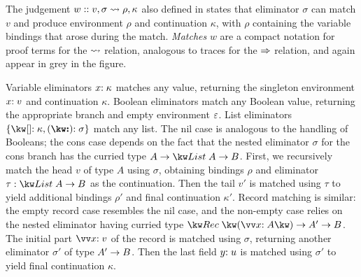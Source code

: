 The judgement $w :: v, \sigma \rightsquigarrow \rho, \kappa$ also defined in  states that eliminator $\sigma$ can match $v$ and produce environment $\rho$ and continuation $\kappa$, with $\rho$ containing the variable bindings that arose during the match. \emph{Matches} $w$ are a compact notation for proof terms for the $\rightsquigarrow$ relation, analogous to traces for the $\Rightarrow$ relation, and again appear in grey in the figure.

Variable eliminators ${x}{:}\;{\kappa}$ matches any value, returning the singleton environment $x{:}\;v$ and continuation $\kappa$. Boolean eliminators match any Boolean value, returning the appropriate branch and empty environment $\varepsilon$. List eliminators $\elimList{\kappa}{\sigma}$ match any list. The nil case is analogous to the handling of Booleans; the cons case depends on the fact that the nested eliminator $\sigma$ for the cons branch has the curried type $\tyFun{A}{\tyFun{\tyList{A}}{B}}$. First, we recursively match the head $v$ of type $A$ using $\sigma$, obtaining bindings $\rho$ and eliminator $\tau: \tyFun{\tyList{A}}{B}$ as the continuation. Then the tail $v'$ is matched using $\tau$ to yield additional bindings $\rho'$ and final continuation $\kappa'$. Record matching is similar: the empty record case resembles the nil case, and the non-empty case relies on the nested eliminator having curried type $\tyFun{\tyRec{\vec{\bind{x}{A}}}}{\tyFun{A'}{B}}$. The initial part $\vec{\bind{x}{v}}$ of the record is matched using $\sigma$, returning another eliminator $\sigma'$ of type ${A'}\rightarrow{B}$. Then the last field $y{:}\;u$ is matched using $\sigma'$ to yield final continuation $\kappa$.
